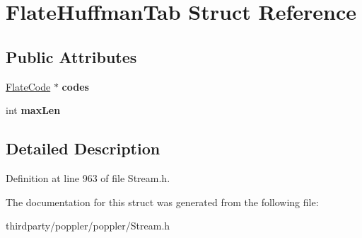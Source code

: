 \hypertarget{struct_flate_huffman_tab}{}\section{Flate\+Huffman\+Tab Struct Reference}
\label{struct_flate_huffman_tab}
\subsection*{Public Attributes}
\begin{DoxyCompactItemize}
\item 
\mbox{\label{struct_flate_huffman_tab_abb47d8f73b9a1f43c046d035439d63ca}} 
\hyperlink{struct_flate_code}{Flate\+Code} $\ast$ {\bfseries codes}
\item 
\mbox{\label{struct_flate_huffman_tab_ada1d734563b8b6da0cb04c067357d652}} 
int {\bfseries max\+Len}
\end{DoxyCompactItemize}


\subsection{Detailed Description}


Definition at line 963 of file Stream.\+h.



The documentation for this struct was generated from the following file\+:\begin{DoxyCompactItemize}
\item 
thirdparty/poppler/poppler/Stream.\+h\end{DoxyCompactItemize}
